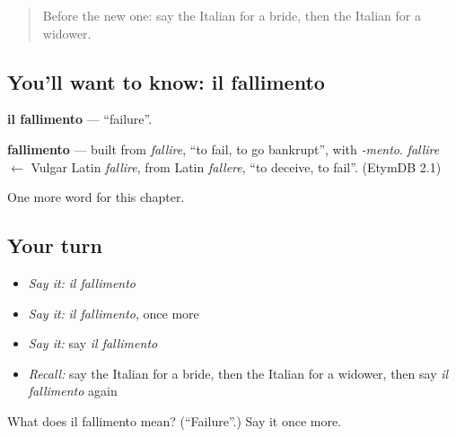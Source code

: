 \label{lesson:IT-C164-fallimento}



\begin{quote}
Before the new one: say the Italian for a bride, then the Italian for a widower.
\end{quote}

\subsection*{You'll want to know: il fallimento}
\textbf{il fallimento} — \textquotedblleft{}failure\textquotedblright{}.

\begin{cousinweb}
\textbf{fallimento} — built from \emph{fallire}, \textquotedblleft{}to fail, to go bankrupt\textquotedblright{}, with \emph{-mento}. \emph{fallire} $\leftarrow$ Vulgar Latin \emph{fallire}, from Latin \emph{fallere}, \textquotedblleft{}to deceive, to fail\textquotedblright{}. (EtymDB 2.1)
\end{cousinweb}

\begin{grammarlens}[title={What you've built}]
One more word for this chapter.
\end{grammarlens}

\subsection*{Your turn}
\begin{itemize}
\raggedright
  \item \emph{Say it:} \emph{il fallimento}
  \item \emph{Say it:} \emph{il fallimento}, once more
  \item \emph{Say it:} say \emph{il fallimento}
  \item \emph{Recall:} say the Italian for a bride, then the Italian for a widower, then say \emph{il fallimento} again
\end{itemize}

\begin{tcolorbox}[breakable,colback=teal!4,colframe=teal!35!black,title={Before you move on}]
What does il fallimento mean? (\textquotedblleft{}Failure\textquotedblright{}.) Say it once more.
\end{tcolorbox}
